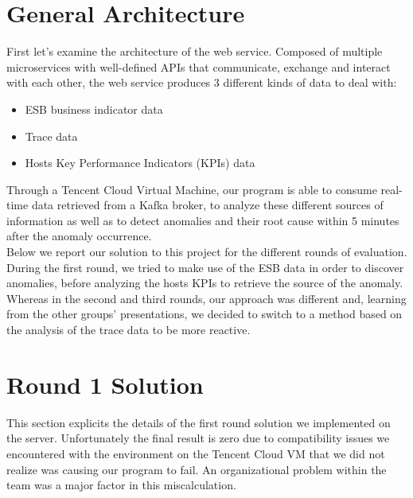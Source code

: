 \documentclass[acmsmall, screen, nonacm]{acmart}
\begin{document}
\section{General Architecture}
First let's examine the architecture of the web service. 
Composed of multiple microservices with well-defined APIs that communicate, exchange and interact with each other, the web service produces 3 different kinds of data to deal with:
\begin{itemize}
  \item ESB business indicator data
  \item Trace data
  \item Hosts Key Performance Indicators (KPIs) data 
\end{itemize}
Through a Tencent Cloud Virtual Machine, our program is able to consume real-time data retrieved from a Kafka broker, to analyze these different sources of information as well as to detect anomalies and their root cause within 5 minutes after the anomaly occurrence. 
\\
Below we report our solution to this project for the different rounds of evaluation. 
During the first round, we tried to make use of the ESB data in order to discover anomalies, before analyzing the hosts KPIs to retrieve the source of the anomaly. 
Whereas in the second and third rounds, our approach was different and, learning from the other groups' presentations, we decided to switch to a method based on the analysis of the trace data to be more reactive. 
   


\section{Round 1 Solution}
This section explicits the details of the first round solution we implemented on the server. 
Unfortunately the final result is zero due to compatibility issues we encountered with the environment on the Tencent Cloud VM that we did not realize was causing our program to fail. 
An organizational problem within the team was a major factor in this miscalculation. 
\end{document}
